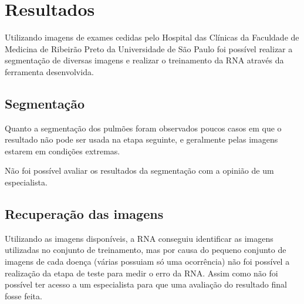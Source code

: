 \chapter{Resultados}

Utilizando imagens de exames cedidas pelo Hospital das Clínicas da Faculdade de Medicina de Ribeirão Preto da Universidade de São Paulo foi possível realizar a segmentação de diversas imagens e realizar o treinamento da RNA através da ferramenta desenvolvida.

\section{Segmentação}

Quanto a segmentação dos pulmões foram observados poucos casos em que o resultado não pode ser usada na etapa seguinte, e geralmente pelas imagens estarem em condições extremas.

Não foi possível avaliar os resultados da segmentação com a opinião de um especialista.

\section{Recuperação das imagens}

Utilizando as imagens disponíveis, a RNA conseguiu identificar as imagens utilizadas no conjunto de treinamento, mas por causa do pequeno conjunto de imagens de cada doença (várias possuiam só uma ocorrência) não foi possível a realização da etapa de teste para medir o erro da RNA. Assim como não foi possível ter acesso a um especialista para que uma avaliação do resultado final fosse feita.